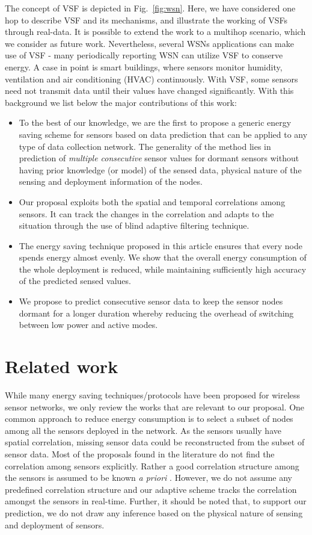 \documentclass[a4paper,conference]{IEEEtran}
\begin{document}
The concept of VSF is depicted in Fig.~\ref{fig:wsn}. Here, we have considered one hop to describe VSF and its mechanisms, and illustrate the working of VSFs through real-data. It is possible to extend the work to a multihop scenario, which we consider as future work. Nevertheless, several WSNs applications can make use of VSF - many periodically reporting WSN can utilize VSF to conserve energy. A case in point is smart buildings, where sensors monitor humidity, ventilation and air conditioning (HVAC) continuously. With VSF, some sensors need not transmit data until their values have changed significantly. With this background we list below the major contributions of this work: 
\begin{itemize}
\item To the best of our knowledge, we are the first to propose a generic energy saving scheme for sensors based on data prediction that can be applied to any type of data collection network. The generality of the method lies in prediction of \emph{multiple consecutive} sensor values for dormant sensors without having prior knowledge (or model) of the sensed data, physical nature of the sensing and deployment information of the nodes. 
\item Our proposal exploits both the spatial and temporal correlations among sensors. It can track the changes in the correlation and adapts to the situation through the use of blind adaptive filtering technique. 
\item The energy saving technique proposed in this article ensures that every node spends energy almost evenly. We show that the overall energy consumption of the whole deployment is reduced, while maintaining sufficiently high accuracy of the predicted sensed values. 
\item We propose to predict consecutive sensor data to keep the sensor nodes dormant for a longer duration whereby reducing the overhead of switching between low power and active modes.
\end{itemize}
\section{Related work}
\label{sec:rel}
While many energy saving techniques/protocols have been proposed for wireless sensor networks, we only review the works that are relevant to our proposal. One common approach to reduce energy consumption is to select a subset of nodes among all the sensors deployed in the network. As the sensors usually have spatial correlation, missing sensor data could be reconstructed from the subset of sensor data. Most of the proposals found in the literature do not find the correlation among sensors explicitly. Rather a good correlation structure among the sensors is assumed to be known \textit{a priori} \cite{chu2006approximate,cristescu2005optimal, deshpande2004model, Gupta2008, jain2004adaptive, Quan2007}. However, we do not assume any predefined correlation structure and our adaptive scheme tracks the correlation amongst the sensors in real-time. Further, it should be noted that, to support our prediction, we do not draw any inference based on the physical nature of sensing and deployment of sensors. 
\end{document}
